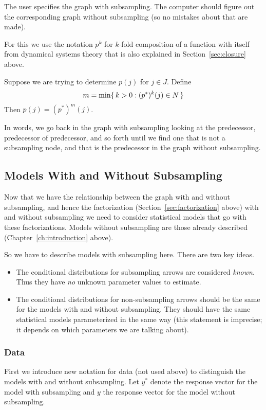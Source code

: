 The user specifies the graph with subsampling.  The computer should figure
out the corresponding graph without subsampling (so no mistakes about that
are made).

For this we use the notation $p^k$ for $k$-fold composition of a function
with itself from dynamical systems theory that is also explained in
Section~\ref{sec:closure} above.

Suppose we are trying to determine $p(j)$ for $j \in J$.
Define
$$
   m = \min \{\,  k > 0 : (p^*)^k(j) \in N  \,\}
$$
Then $p(j) = (p^*)^m(j)$.

In words, we go back in the graph with subsampling looking at the predecessor,
predecessor of predecessor, and so forth until we find one that is not a
subsampling node, and that is the predecessor in the graph without subsampling.

\subsection{Models With and Without Subsampling}
\label{sec:models-with-and-without}

Now that we have the relationship between the graph with and without
subsampling, and hence the factorization (Section~\ref{sec:factorization}
above) with and without subsampling we need to consider statistical models
that go with these factorizations.  Models without subsampling are those
already described (Chapter~\ref{ch:introduction} above).

So we have to describe models with subsampling here.
There are two key ideas.
\begin{itemize}
\item The conditional distributions for subsampling arrows are considered
\emph{known}.
Thus they have \emph{no} unknown parameter values to estimate.
\item The conditional distributions for non-subsampling arrows should be
the same for the models with and without subsampling.  They should have
the same statistical models parameterized in the same way
(this statement is imprecise; it depends on which parameters
we are talking about).
\end{itemize}

\subsubsection{Data}

First we introduce new notation for data (not used above) to distinguish
the models with and without subsampling.  Let $y^*$ denote the response
vector for the model with subsampling and $y$ the response
vector for the model without subsampling.

